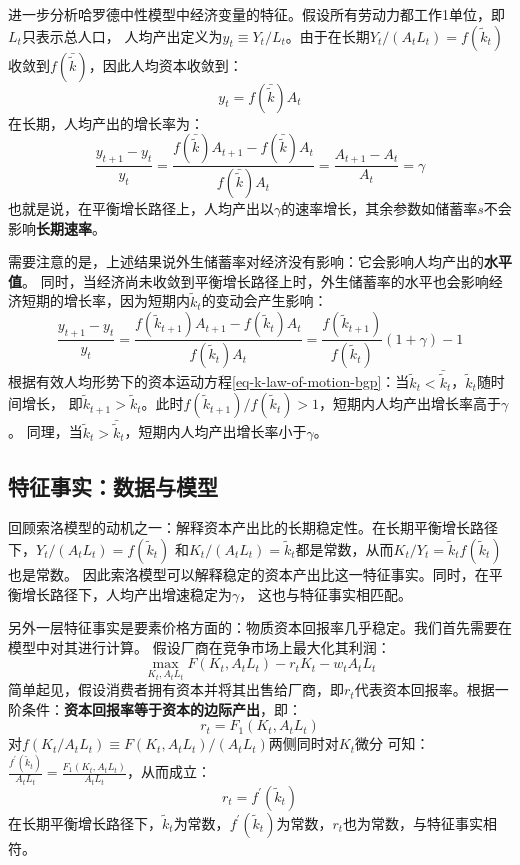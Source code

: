 进一步分析哈罗德中性模型中经济变量的特征。假设所有劳动力都工作1单位，即$L_t$只表示总人口，
人均产出定义为$y_t\equiv Y_t/L_t$。由于在长期$Y_t /\left(A_t L_t\right)=f(\tilde{k}_t)$
收敛到$f(\bar{\tilde{k}})$，因此人均资本收敛到：
\begin{equation*}
    y_t = f(\bar{\tilde{k}})A_t
\end{equation*}
在长期，人均产出的增长率为：
\begin{equation*}
    \frac{y_{t+1}-y_t}{y_t}=\frac{f(\bar{\tilde{k}}) A_{t+1}-f(\bar{\tilde{k}}) A_t}{f(\bar{\tilde{k}}) A_t}
        =\frac{A_{t+1}-A_t}{A_t}=\gamma
\end{equation*}
也就是说，在平衡增长路径上，人均产出以$\gamma$的速率增长，其余参数如储蓄率$s$不会影响\textbf{长期速率}。

需要注意的是，上述结果说外生储蓄率对经济没有影响：它会影响人均产出的\textbf{水平值}。
同时，当经济尚未收敛到平衡增长路径上时，外生储蓄率的水平也会影响经济短期的增长率，因为短期内$\tilde{k}_t$的变动会产生影响：
\begin{equation*}
    \frac{y_{t+1}-y_t}{y_t} = 
        \frac{f(\tilde{k}_{t+1}) A_{t+1}-f(\tilde{k}_t) A_t}{f(\tilde{k}_t) A_t} = 
            \frac{f(\tilde{k}_{t+1})}{f(\tilde{k}_t)}(1+\gamma)-1
\end{equation*}
根据有效人均形势下的资本运动方程\cref{eq-k-law-of-motion-bgp}：当$\tilde{k}_t<\bar{\tilde{k}}_t$，$\tilde{k}_t$随时间增长，
即$\tilde{k}_{t+1}>\tilde{k}_t$。此时$f(\tilde{k}_{t+1})/f(\tilde{k}_t)>1$，短期内人均产出增长率高于$\gamma$。
同理，当$\tilde{k}_t>\bar{\tilde{k}}_t$，短期内人均产出增长率小于$\gamma$。


\subsection{特征事实：数据与模型}

回顾索洛模型的动机之一：解释资本产出比的长期稳定性。在长期平衡增长路径下，$Y_t/(A_tL_t) = f(\tilde{k}_t)$
和$K_t/(A_tL_t)=\tilde{k}_t$都是常数，从而$K_t/Y_t=\tilde{k}_tf(\tilde{k}_t)$也是常数。
因此索洛模型可以解释稳定的资本产出比这一特征事实。同时，在平衡增长路径下，人均产出增速稳定为$\gamma$，
这也与特征事实相匹配。

另外一层特征事实是要素价格方面的：物质资本回报率几乎稳定。我们首先需要在模型中对其进行计算。
假设厂商在竞争市场上最大化其利润：
\begin{equation}
    \max _{K_t, A_t L_t} F\left(K_t, A_t L_t\right)-r_t K_t-w_t A_t L_t
\end{equation}
简单起见，假设消费者拥有资本并将其出售给厂商，即$r_t$代表资本回报率。根据一阶条件：\textbf{资本回报率等于资本的边际产出}，即：
\begin{equation*}
    r_t = F_1\left(K_t, A_tL_t\right) 
\end{equation*}
对$f(K_t/A_tL_t) \equiv F\left(K_t, A_tL_t\right)/(A_tL_t)$两侧同时对$K_t$微分
可知：$\frac{f^{\prime}(\tilde{k}_t)}{A_tL_t}=\frac{F_1\left(K_t, A_tL_t\right)}{A_tL_t}$，从而成立：
\begin{equation*}
    r_t = f^{\prime}(\tilde{k}_t)
\end{equation*}
在长期平衡增长路径下，$\tilde{k}_t$为常数，$f^{\prime}(\tilde{k}_t)$为常数，$r_t$也为常数，与特征事实相符。

